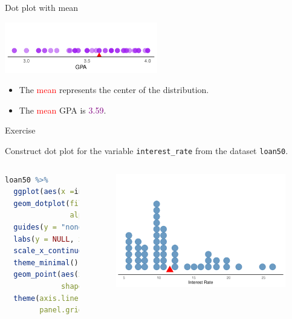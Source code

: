 \documentclass[notes,11pt, aspectratio=169]{beamer}
\begin{document}
\begin{frame}{Dot plot with mean}
\begin{center}
\includegraphics[width=0.5\textwidth]{graphs/l02f03.pdf}
\end{center}
\pause

\begin{itemize}
\item The \textcolor{red}{mean} represents the center of the distribution.
\item The \textcolor{red}{mean} GPA is \pause \textcolor{purple}{3.59}.
\end{itemize}
\end{frame}


\begin{frame}[fragile]{Exercise}
\begin{center}
Construct dot plot for the variable \texttt{interest\_rate} from the dataset \texttt{loan50}.
\end{center}

\pause

\begin{columns}
      \centering
\begin{lstlisting}[language=R]
  loan50 %>% 
  ggplot(aes(x =interest_rate)) + 
  geom_dotplot(fill = "steelblue", color = "steelblue",
               alpha = 0.8, binwidth = 0.9) + 
  guides(y = "none") + 
  labs(y = NULL, x = "Interest Rate") + 
  scale_x_continuous(breaks = c(5, 10, 15, 20, 25)) + 
  theme_minimal() + 
  geom_point(aes(x = mean(interest_rate), y=0), 
             shape = 17, size = 6, color = "red") +
  theme(axis.line.x = element_line(),
        panel.grid = element_blank())

\end{lstlisting}

\pause

      \centering
      \begin{figure}
      \includegraphics[scale=0.5]{graphs/l02f04.pdf}
      \end{figure}
\end{columns}
\end{frame}
\end{document}
